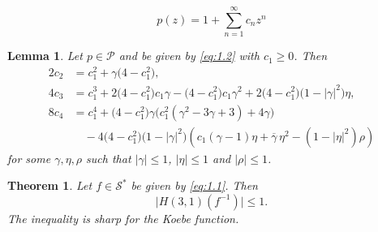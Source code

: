 \documentclass[10pt,a4paper]{amsart}
\newtheorem{lem}{Lemma}
\newtheorem{thm}{Theorem}
\begin{document}
\begin{equation}
	\label{eq:1.2}
	p(z)=1+\sum_{n=1}^{\infty}c_n z^n
\end{equation}

\begin{lem}{\cite{LiberaZlotkiewicz1982}}
	\label{lem:1.1}
		Let $p \in \mathcal{P}$ and be given by \eqref{eq:1.2} with $c_1 \ge 0$. Then
		\begin{align*}
			2 c_2 &= c_1^2 + \gamma \bigl(4 - c_1^2\bigr), \\[2mm]
			4 c_3 &= c_1^3 + 2\bigl(4 - c_1^2\bigr)c_1 \gamma
			- \bigl(4 - c_1^2\bigr)c_1 \gamma^2
			+ 2\bigl(4 - c_1^2\bigr)\bigl(1 - |\gamma|^2\bigr)\eta, \\[2mm]
			8 c_4 &= c_1^4
			+ \bigl(4 - c_1^2\bigr)\gamma\bigl(c_1^2(\gamma^2 - 3\gamma + 3) + 4\gamma\bigr)\\[1mm]
			&\quad- 4\bigl(4 - c_1^2\bigr)\bigl(1 - |\gamma|^2\bigr)
			\left(c_1(\gamma - 1)\eta + \overline{\gamma}\,\eta^2
			- (1 - |\eta|^2)\rho\right)
		\end{align*}
		for some $\gamma,\eta,\rho$ such that $|\gamma| \le 1$, $|\eta| \le 1$ and $|\rho| \le 1$.
	\end{lem}

	\begin{thm}
		\label{thm:2.1}
		Let $f \in \mathcal{S}^{*}$  be given by \eqref{eq:1.1}. Then
		\[
		\bigl| H(3,1)(f^{-1}) \bigr| \le 1.
		\]
		The inequality is sharp for the Koebe function.
	\end{thm}
\end{document}
